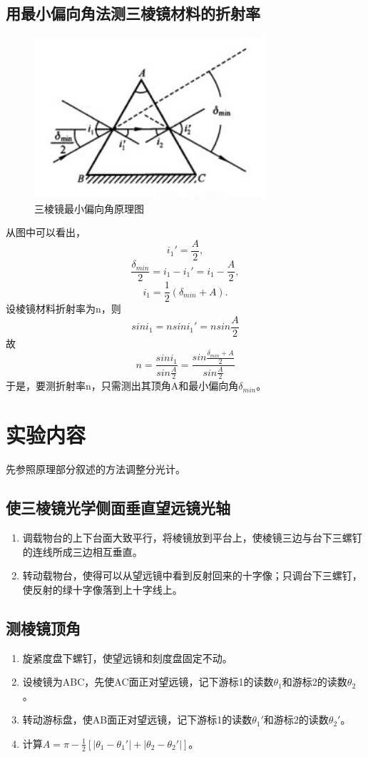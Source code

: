 \documentclass[UTF8]{ctexart}
\begin{document}
\subsection{用最小偏向角法测三棱镜材料的折射率}
\begin{figure}[h]
    \centering
    \includegraphics[scale=1]{折射率测量原理.PNG}
    \caption{三棱镜最小偏向角原理图}
\end{figure}
从图中可以看出，
\[i_1'=\frac{A}{2},\]
\[\frac{\delta_{min}}{2}=i_1-i_1'=i_1-\frac{A}{2},\]
\[i_1=\frac{1}{2}\left( \delta_{min}+A \right).\]
设棱镜材料折射率为n，则
\[sin i_1=nsin i_1'=nsin\frac{A}{2}\]
故
\[n=\frac{sin i_1}{sin\frac{A}{2}}=\frac{sin\frac{\delta_{min}+A}{2}}{sin \frac{A}{2}}\]
于是，要测折射率n，只需测出其顶角A和最小偏向角$\delta_{min}$。
\section{实验内容}
先参照原理部分叙述的方法调整分光计。
\subsection{使三棱镜光学侧面垂直望远镜光轴}
\begin{enumerate}
    \item 调载物台的上下台面大致平行，将棱镜放到平台上，使棱镜三边与台下三螺钉的连线所成三边相互垂直。
    \item 转动载物台，使得可以从望远镜中看到反射回来的十字像；只调台下三螺钉，使反射的绿十字像落到上十字线上。
\end{enumerate}
\subsection{测棱镜顶角}
\begin{enumerate}
    \item 旋紧度盘下螺钉，使望远镜和刻度盘固定不动。
    \item 设棱镜为ABC，先使AC面正对望远镜，记下游标1的读数$\theta_1$和游标2的读数$\theta_2$。
    \item 转动游标盘，使AB面正对望远镜，记下游标1的读数$\theta_1'$和游标2的读数$\theta_2'$。
    \item 计算$A=\pi-\frac{1}{2}\left[ | \theta_1-\theta_1'| +| \theta_2-\theta_2'|  \right]$。
\end{enumerate}
\end{document}
